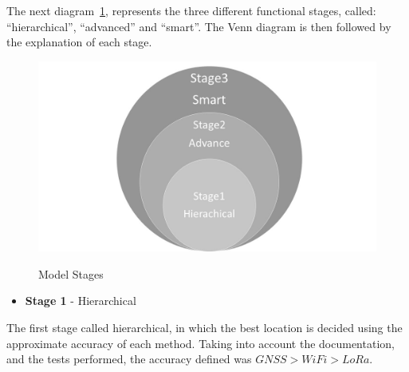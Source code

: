 The next diagram~\ref{fig:Stages}, represents the three different functional stages, called: “hierarchical”, “advanced” and “smart”. The Venn diagram is then followed by the explanation of each stage.

\begin{figure}[htbp]
  \centering
  
   {\includegraphics[width=0.55\linewidth]{Chapters/Figures/Stages.jpg}}
 
  \caption{Model Stages}
  \label{fig:Stages}
\end{figure}


\begin{itemize}
\item \textbf{Stage 1} - Hierarchical 
\end{itemize}


The first stage called hierarchical, in which the best location is decided using the approximate accuracy of each method. Taking into account the documentation, and the tests performed, the accuracy defined was $GNSS > WiFi > LoRa$.

